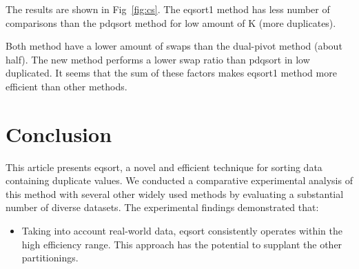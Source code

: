 \documentclass{article}
\begin{document}
 The results are shown in Fig~\ref{fig:cs}. The eqsort1 method has less number of comparisons  than the pdqsort method  for low amount of K (more duplicates).

  Both method have a lower amount of swaps than the dual-pivot method (about half). The new method performs a lower swap ratio than pdqsort in low duplicated. It seems that the sum of these factors makes eqsort1 method more efficient than other methods.

\section {Conclusion}
This article presents eqsort, a novel and efficient technique for sorting data containing duplicate values. We conducted a comparative experimental analysis of this method with several other widely used methods by evaluating a substantial number of diverse datasets. The experimental findings demonstrated that:\\
\begin{itemize}

\item  Taking into account real-world data, eqsort consistently operates within the high efficiency range. This approach has the potential to supplant the other partitionings.
\end{itemize}


\appendix


\appendix
\end{document}

